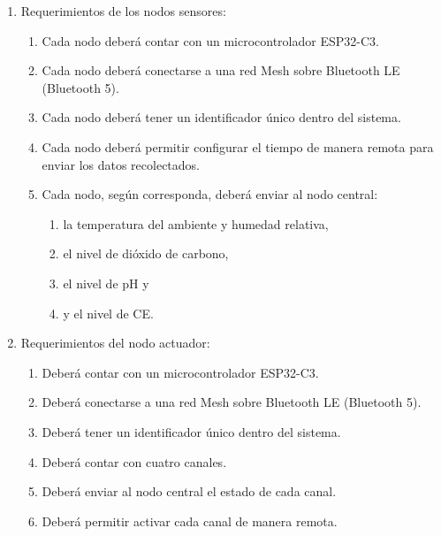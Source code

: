 \documentclass[
11pt, %
codirector, %
]{charter}
\begin{document}
\begin{enumerate}
	\item Requerimientos de los nodos sensores:
	      \begin{enumerate}
		      \item Cada nodo deberá contar con un microcontrolador ESP32-C3.
		      \item Cada nodo deberá conectarse a una red Mesh sobre Bluetooth LE (Bluetooth 5).
		      \item Cada nodo deberá tener un identificador único dentro del sistema.
		      \item Cada nodo deberá permitir configurar el tiempo de manera remota para enviar los datos recolectados.
		      \item Cada nodo, según corresponda, deberá enviar al nodo central:
		            \begin{enumerate}
			            \item la temperatura del ambiente y humedad relativa,
			            \item el nivel de dióxido de carbono,
			            \item el nivel de pH y
			            \item y el nivel de CE.
		            \end{enumerate}
	      \end{enumerate}

	\item Requerimientos del nodo actuador:
	      \begin{enumerate}
		      \item Deberá contar con un microcontrolador ESP32-C3.
		      \item Deberá conectarse a una red Mesh sobre Bluetooth LE (Bluetooth 5).
		      \item Deberá tener un identificador único dentro del sistema.
		      \item Deberá contar con cuatro canales.
		      \item Deberá enviar al nodo central el estado de cada canal.
		      \item Deberá permitir activar cada canal de manera remota.
	      \end{enumerate}


\end{enumerate}
\end{document}
